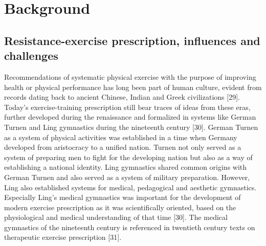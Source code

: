 \documentclass[twoside,10pt]{gihclass} %
\begin{document}
\hypertarget{background}{%
\chapter{Background}\label{background}}

\hypertarget{resistance-exercise-prescription-influences-and-challenges}{%
\section{Resistance-exercise prescription, influences and challenges}\label{resistance-exercise-prescription-influences-and-challenges}}

Recommendations of systematic physical exercise with the purpose of improving health or physical performance has long been part of human culture, evident from records dating back to ancient Chinese, Indian and Greek civilizations
{[}29{]}.
Today's exercise-training prescription still bear traces of ideas from these eras, further developed during the renaissance and formalized in systems like German Turnen and Ling gymnastics during the nineteenth century
{[}30{]}.
German Turnen as a system of physical activities was established in a time when Germany developed from aristocracy to a unified nation.
Turnen not only served as a system of preparing men to fight for the developing nation but also as a way of establishing a national identity.
Ling gymnastics shared common origins with German Turnen and also served as a system of military preparation.
However, Ling also established systems for medical, pedagogical and aesthetic gymnastics.
Especially Ling's medical gymnastics was important for the development of modern exercise prescription as it was scientifically oriented, based on the physiological and medical understanding of that time {[}30{]}.
The medical gymnastics of the nineteenth century is referenced in twentieth century texts on therapeutic exercise prescription
{[}31{]}.
\end{document}
